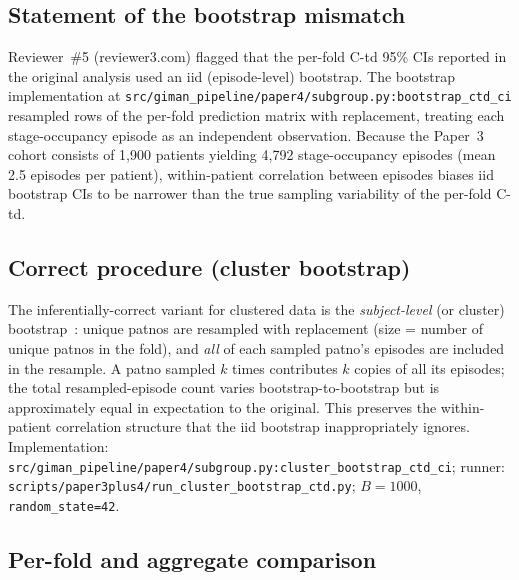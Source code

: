 \documentclass[11pt]{article}
\begin{document}
\subsection*{Statement of the bootstrap mismatch}

Reviewer~\#5 (reviewer3.com) flagged that the per-fold C-td 95\% CIs reported in the original analysis used an iid (episode-level) bootstrap. The bootstrap implementation at \texttt{src/giman\_pipeline/paper4/subgroup.py:bootstrap\_ctd\_ci} resampled rows of the per-fold prediction matrix with replacement, treating each stage-occupancy episode as an independent observation. Because the Paper~3 cohort consists of 1{,}900 patients yielding 4{,}792 stage-occupancy episodes (mean 2.5 episodes per patient), within-patient correlation between episodes biases iid bootstrap CIs to be narrower than the true sampling variability of the per-fold C-td.

\subsection*{Correct procedure (cluster bootstrap)}

The inferentially-correct variant for clustered data is the \emph{subject-level} (or cluster) bootstrap~\cite{davison1997bootstrap,field2007bootstrap}: unique patnos are resampled with replacement (size = number of unique patnos in the fold), and \emph{all} of each sampled patno's episodes are included in the resample. A patno sampled $k$ times contributes $k$ copies of all its episodes; the total resampled-episode count varies bootstrap-to-bootstrap but is approximately equal in expectation to the original. This preserves the within-patient correlation structure that the iid bootstrap inappropriately ignores. Implementation: \texttt{src/giman\_pipeline/paper4/subgroup.py:cluster\_bootstrap\_ctd\_ci}; runner: \texttt{scripts/paper3plus4/run\_cluster\_bootstrap\_ctd.py}; $B{=}1000$, \texttt{random\_state=42}.

\subsection*{Per-fold and aggregate comparison}
\end{document}
